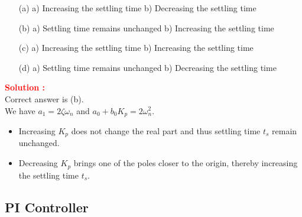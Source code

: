 \documentclass[12pt]{article}
\begin{document}
\begin{itemize}
    \item[(a)] a) Increasing the settling time b) Decreasing the settling time
    \item[(b)] a) Settling time remains unchanged b) Increasing the settling time
    \item[(c)] a) Increasing the settling time b) Increasing the settling time
    \item[(d)] a) Settling time remains unchanged b) Decreasing the settling time
\end{itemize}

\textbf{\textcolor{red}{Solution :}} \\
Correct answer is (b).\\
We have \(a_1 = 2\zeta \omega_n\) and \(a_0 + b_0 K_p = 2  \omega_n^2\). \\
\begin{itemize}
    \item Increasing \(K_p\) does not change the real part and thus settling time \(t_s\) remain unchanged.
    \item Decreasing \(K_p\) brings one of the poles closer to the origin, thereby increasing the settling time \(t_s\).
\end{itemize}
\clearpage

\subsection{PI Controller}
\end{document}
